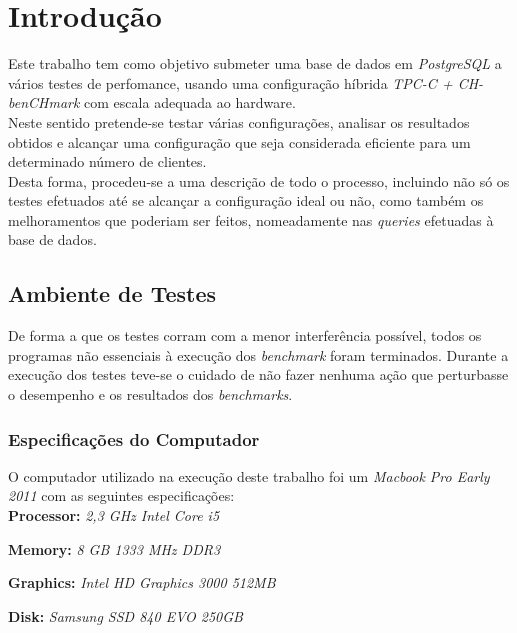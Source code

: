 \section{Introdução}

Este trabalho tem como objetivo submeter uma base de dados em \textit{PostgreSQL} a vários testes de perfomance, usando uma configuração híbrida \textit{TPC-C + CH-benCHmark} com escala adequada ao hardware.\\

Neste sentido pretende-se testar várias configurações, analisar os resultados obtidos e alcançar uma configuração que seja considerada eficiente para um determinado número de clientes.\\

Desta forma, procedeu-se a uma descrição de todo o processo, incluindo não só os testes efetuados até se alcançar a configuração ideal ou não, como também os melhoramentos que poderiam ser feitos, nomeadamente nas \textit{queries} efetuadas à base de dados.\\

\subsection{Ambiente de Testes}

De forma a que os testes corram com a menor interferência possível, todos os programas não essenciais à execução dos \textit{benchmark} foram terminados. Durante a execução dos testes teve-se o cuidado de não fazer nenhuma ação que perturbasse o desempenho e os resultados dos \textit{benchmarks}.

\subsubsection{Especificações do Computador}

O computador utilizado na execução deste trabalho foi um \textit{Macbook Pro Early 2011} com as seguintes especificações:\\

\textbf{Processor:} \textit{2,3 GHz Intel Core i5}

\textbf{Memory:} \textit{8 GB 1333 MHz DDR3}

\textbf{Graphics:} \textit{Intel HD Graphics 3000 512MB}

\textbf{Disk:} \textit{Samsung SSD 840 EVO 250GB}
